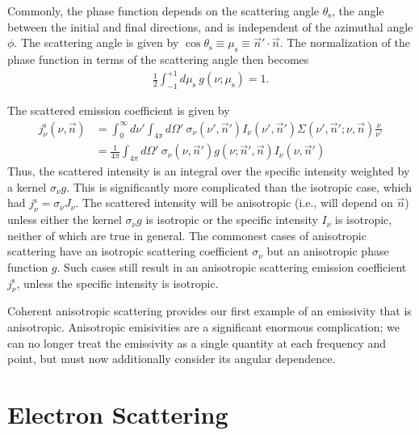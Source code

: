 Commonly, the phase function depends on the scattering angle
$\theta_\mathrm{s}$, the angle between the initial and final
directions, and is independent of the azimuthal angle
$\phi$. The scattering angle is given by $\cos
\theta_\mathrm{s}
\equiv \mu_\mathrm{s} \equiv \vec n'\cdot \vec n$. The
normalization of the phase function in terms of the
scattering angle then becomes
\begin{align}
\frac{1}{2} \int_{-1}^{+1} \!\!\! d\mu_\mathrm{s}
\:
g(\nu; \mu_\mathrm{s}) 
=
1.
\end{align}

The scattered emission coefficient is given by
\begin{align}
j_\nu^\mathrm{s}(\nu,\vec n) 
&=
\int_0^\infty \!\!\! d\nu' 
\int_{4\pi} \!\!\! d\Omega'
\:
\sigma_\nu(\nu', \vec n')
I_\nu(\nu', \vec n')
\Sigma(\nu', \vec n'; \nu, \vec n)
\frac{\nu}{\nu'}\\
&=
\frac{1}{4\pi} 
\int_{4\pi} \!\!\! d\Omega'
\:
\sigma_\nu(\nu, \vec n')
g(\nu; \vec n', \vec n)
I_\nu(\nu, \vec n')
\end{align}
Thus, the scattered intensity is an integral over the
specific intensity weighted by a kernel $\sigma_\nu g$. This
is significantly more complicated than the isotropic case,
which had $j_\nu^\mathrm{s} = \sigma_\nu J_\nu$. The
scattered intensity will be anisotropic (i.e., will depend
on $\vec n$) unless either the kernel $\sigma_\nu g$ is
isotropic or the specific intensity $I_\nu$ is isotropic,
neither of which are true in general. The commonest cases of
anisotropic scattering have an isotropic scattering
coefficient $\sigma_\nu$ but an anisotropic phase function
$g$. Such cases still result in an anisotropic scattering
emission coefficient $j_\nu^\mathrm{s}$, unless the specific
intensity is isotropic.

Coherent anisotropic scattering provides our first example
of an emissivity that is anisotropic. Anisotropic
emisivities are a significant enormous complication; we can
no longer treat the emissivity as a single quantity at each
frequency and point, but must now additionally consider its
angular dependence.

\section{Electron Scattering}

